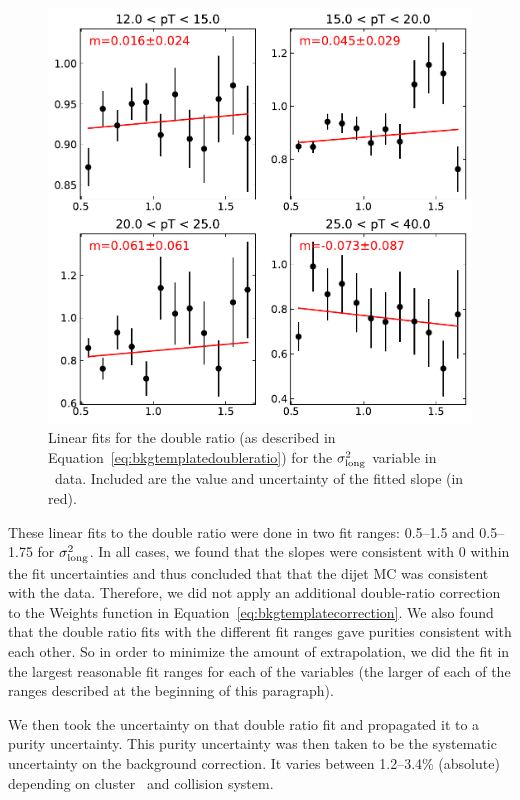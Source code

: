 \begin{figure}
    \centering
    \includegraphics[width=\textwidth]{Purity/single-linear-fits-p-Pb}
    \caption{Linear fits for the double ratio (as described in Equation~\ref{eq:bkgtemplatedoubleratio}) for the $\sigma^{2}_{\mathrm{long}}$ variable in \pPb~data.  Included are the value and uncertainty of the fitted slope (in red).}
    \label{fig:bkgtemplatedoubleratiofits_pPb}
\end{figure}







These linear fits to the double ratio were done in two fit ranges: 0.5--1.5 and 0.5--1.75 for $\sigma^{2}_{\mathrm{long}}$. In all cases, we found that the slopes were consistent with 0 within the fit uncertainties and thus concluded that that the dijet MC was consistent with the data. Therefore, we did not apply an additional double-ratio correction to the Weights function in Equation~\ref{eq:bkgtemplatecorrection}. We also found that the double ratio fits with the different fit ranges gave purities consistent with each other. So in order to minimize the amount of extrapolation, we did the fit in the largest reasonable fit ranges for each of the variables (the larger of each of the ranges described at the beginning of this paragraph). 

We then took the uncertainty on that double ratio fit and propagated it to a purity uncertainty. This purity uncertainty was then taken to be the systematic uncertainty on the background correction. It varies between 1.2--3.4\% (absolute) depending on cluster \pt~and collision system.


